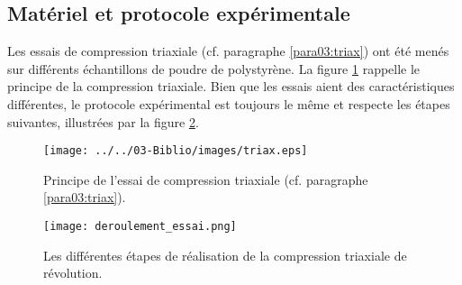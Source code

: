 	\subsection{Matériel et protocole expérimentale}
		Les essais de compression triaxiale (cf. paragraphe \ref{para03:triax}) ont été menés sur différents échantillons de poudre de polystyrène. La figure \ref{fig04:triax} rappelle le principe de la compression triaxiale. Bien que les essais aient des caractéristiques différentes, le protocole expérimental est toujours le même et respecte les étapes suivantes, illustrées par la figure \ref{fig04:deroulement_essai}.
		\begin{figure}\centering
			\texttt{[image: ../../03-Biblio/images/triax.eps]}
			\caption{\label{fig04:triax}Principe de l'essai de compression triaxiale (cf. paragraphe \ref{para03:triax}).}
		\end{figure}
		\begin{figure}\centering
			\texttt{[image: deroulement\_essai.png]}
			\caption{\label{fig04:deroulement_essai}Les différentes étapes de réalisation de la compression triaxiale de révolution.}
		\end{figure}
